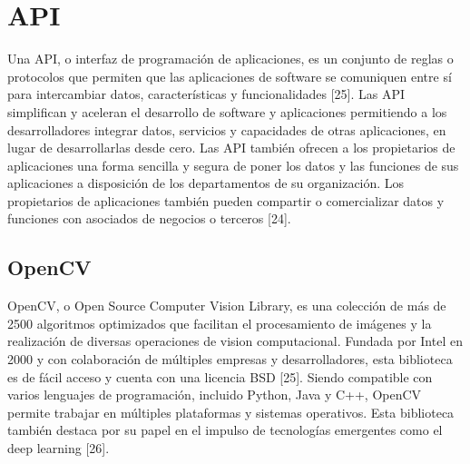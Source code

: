 
\section{API}

\begin{list}{}%
    {\setlength{\leftmargin}{1cm}\setlength{\rightmargin}{1cm}}
    \item\relax
    \small

Una API, o interfaz de programación de aplicaciones, es un conjunto de reglas o protocolos que permiten que las aplicaciones de software se comuniquen entre sí para intercambiar datos, características y funcionalidades [25].
Las API simplifican y aceleran el desarrollo de software y aplicaciones permitiendo a los desarrolladores integrar datos, servicios y capacidades de otras aplicaciones, en lugar de desarrollarlas desde cero. Las API también ofrecen a los propietarios de aplicaciones una forma sencilla y segura de poner los datos y las funciones de sus aplicaciones a disposición de los departamentos de su organización. Los propietarios de aplicaciones también pueden compartir o comercializar datos y funciones con asociados de negocios o terceros [24].

\end{list}

\subsection{OpenCV}

\begin{list}{}%
    {\setlength{\leftmargin}{1cm}\setlength{\rightmargin}{1cm}}
    \item\relax
    \small

OpenCV, o Open Source Computer Vision Library, es una colección de más de 2500 algoritmos optimizados que facilitan el procesamiento de imágenes y la realización de diversas operaciones de vision computacional. Fundada por Intel en 2000 y con colaboración de múltiples empresas y desarrolladores, esta biblioteca es de fácil acceso y cuenta con una licencia BSD [25].
Siendo compatible con varios lenguajes de programación, incluido Python, Java y C++, OpenCV permite trabajar en múltiples plataformas y sistemas operativos. Esta biblioteca también destaca por su papel en el impulso de tecnologías emergentes como el deep learning [26].

\end{list}

